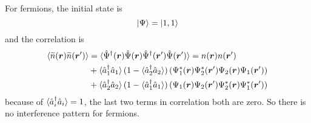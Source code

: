 For fermions, the initial state is
\begin{equation}
    \ket{\Psi} = \ket{1,1}
\end{equation}
and the correlation is 
\begin{equation}
    \begin{aligned}
        \braket{\widetilde{n}(\bm{r}) \widetilde{n}(\bm{r}') } 
        &= \braket{\hat{\Psi}^{\dagger}(\bm{r}) \hat{\Psi}(\bm{r})\hat{\Psi}^{\dagger}(\bm{r}')\hat{\Psi}(\bm{r}')}
        = n(\bm{r})n(\bm{r}') \\
        & + \braket{\hat{a}^{\dagger}_1 \hat{a}_1} (1- \braket{\hat{a}^{\dagger}_2 \hat{a}_2} )
        \left(\Psi^*_1(\bm{r})\Psi^*_2(\bm{r}')\Psi_2(\bm{r})\Psi_1(\bm{r}') \right) \\
        & + \braket{\hat{a}^{\dagger}_2 \hat{a}_2} (1- \braket{\hat{a}^{\dagger}_1 \hat{a}_1} )
        \left(\Psi_1(\bm{r})\Psi_2(\bm{r}')\Psi^*_2(\bm{r})\Psi^*_1(\bm{r}') \right)
    \end{aligned}
\end{equation}
because of $ \braket{\hat{a}^{\dagger}_i \hat{a}_i} = 1$, the last two terms in correlation both are zero. So there is no interference pattern for fermions.